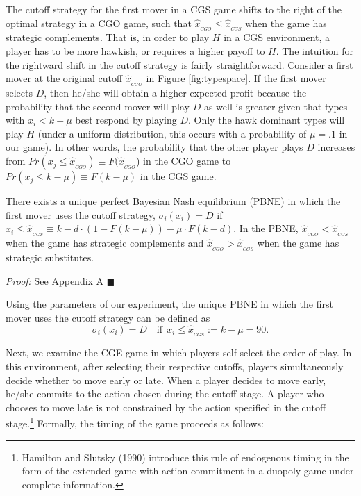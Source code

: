 \documentclass[12pt, letterpaper]{article}
\theoremstyle{plain}
\begin{document}
The cutoff strategy for the first mover in a CGS game shifts to the right of the optimal strategy in a CGO game, such that $\hat{x}_{_{CGO}}\leq\hat{x}_{_{CGS}}$ when the game has strategic complements. That is, in order to play $H$ in a CGS environment, a player has to be more hawkish, or requires a higher payoff to $H$. The intuition for the rightward shift in the cutoff strategy is fairly straightforward. Consider a first mover at the original cutoff $\hat{x}_{_{CGO}}$ in Figure \ref{fig:typespace}. If the first mover selects $D$, then he/she will obtain a higher expected profit because the probability that the second mover will play $D$ as well is greater given that types with $x_i<k-\mu$ best respond by playing $D$. Only the hawk dominant types will play $H$ (under a uniform distribution, this occurs with a probability of $\mu=.1$ in our game). In other words, the probability that the other player plays $D$ increases from $Pr(x_j\leq\hat{x}_{_{CGO}}) \equiv F(\hat{x}_{_{CGO}}$) in the CGO game to  $Pr(x_j\leq k-\mu) \equiv F(k-\mu)  $ in the CGS game. 

\begin{lem}
There exists a unique perfect Bayesian Nash equilibrium (PBNE) in which the first mover uses the cutoff strategy, $\sigma_i(x_i)=D$ if $x_i\leq \hat{x}_{_{CGS}} \equiv k-d\cdot(1-F(k-\mu))-\mu\cdot F(k-d)$.  In the PBNE, $\hat{x}_{_{CGO}}<\hat{x}_{_{CGS}}$ when the game has strategic complements and $\hat{x}_{_{CGO}}>\hat{x}_{_{CGS}}$ when the game has strategic substitutes.
\end{lem}\par
\noindent \textit{Proof:} See Appendix A $\blacksquare$

Using the parameters of our experiment, the unique PBNE in which the first mover uses the cutoff strategy can be defined as
\begin{equation}
\sigma_i(x_i)=D \quad \text{if} \ \ x_i\leq \hat{x}_{_{CGS}}:= k-\mu=90. 
\end{equation}

Next, we examine the CGE game in which players self-select the order of play. In this environment, after selecting their respective cutoffs, players simultaneously decide whether to move early or late. When a player decides to move early, he/she commits to the action chosen during the cutoff stage. A player who chooses to move late is not constrained by the action specified in the cutoff stage.\footnote{Hamilton and Slutsky (1990) introduce this rule of endogenous timing in the form of the extended game with action commitment in a duopoly game under complete information.} Formally, the timing of the game proceeds as follows:
\end{document}

